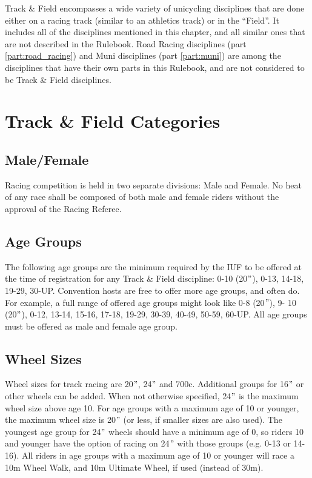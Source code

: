 
Track \& Field encompasses a wide variety of unicycling disciplines that are done either on a racing track (similar to an athletics track) or in the ``Field''.
It includes all of the disciplines mentioned in this chapter, and all similar ones that are not described in the Rulebook.
Road Racing disciplines (part \ref{part:road_racing}) and Muni disciplines (part \ref{part:muni}) are among the disciplines that have their own parts in this Rulebook, and are not considered to be Track \& Field disciplines.

\section{Track \& Field Categories}

\subsection{Male/Female}
Racing competition is held in two separate divisions: Male and Female.
No heat of any race shall be composed of both male and female riders without the approval of the Racing Referee.

\subsection{Age Groups \label{subsec:track-field_racing-categories_age-groups}}
The following age groups are the minimum required by the IUF to be offered at the time of registration for any Track \& Field discipline: 0-10 (20$"$), 0-13, 14-18, 19-29, 30-UP.
Convention hosts are free to offer more age groups, and often do.
For example, a full range of offered age groups might look like 0-8 (20$"$), 9- 10 (20$"$), 0-12, 13-14, 15-16, 17-18, 19-29, 30-39, 40-49, 50-59, 60-UP.
All age groups must be offered as male and female age group.

\subsection{Wheel Sizes}
Wheel sizes for track racing are 20$"$, 24$"$ and 700c.
Additional groups for 16$"$ or other wheels can be added.
When not otherwise specified, 24$"$ is the maximum wheel size above age 10.
For age groups with a maximum age of 10 or younger, the maximum wheel size is 20$"$ (or less, if smaller sizes are also used).
The youngest age group for 24$"$ wheels should have a minimum age of 0, so riders 10 and younger have the option of racing on 24$"$ with those groups (e.g. 0-13 or 14-16).
All riders in age groups with a maximum age of 10 or younger will race a 10m Wheel Walk, and 10m Ultimate Wheel, if used (instead of 30m).

